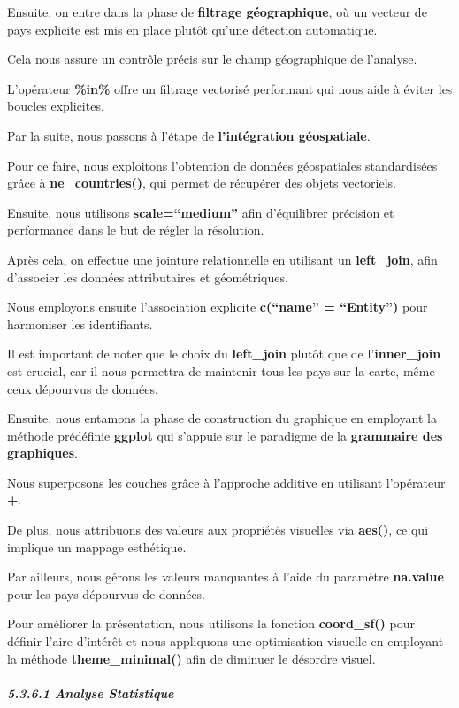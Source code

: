 \documentclass[
]{article}
\begin{document}
Ensuite, on entre dans la phase de \textbf{filtrage géographique}, où un
vecteur de pays explicite est mis en place plutôt qu'une détection
automatique.

Cela nous assure un contrôle précis sur le champ géographique de
l'analyse.

L'opérateur \textbf{\%in\%} offre un filtrage vectorisé performant qui
nous aide à éviter les boucles explicites.

Par la suite, nous passons à l'étape de \textbf{l'intégration
géospatiale}.

Pour ce faire, nous exploitons l'obtention de données géospatiales
standardisées grâce à \textbf{ne\_countries()}, qui permet de récupérer
des objets vectoriels.

Ensuite, nous utilisons \textbf{scale=``medium''} afin d'équilibrer
précision et performance dans le but de régler la résolution.

Après cela, on effectue une jointure relationnelle en utilisant un
\textbf{left\_join}, afin d'associer les données attributaires et
géométriques.

Nous employons ensuite l'association explicite \textbf{c(``name'' =
``Entity'')} pour harmoniser les identifiants.

Il est important de noter que le choix du \textbf{left\_join} plutôt que
de l'\textbf{inner\_join} est crucial, car il nous permettra de
maintenir tous les pays sur la carte, même ceux dépourvus de données.

Ensuite, nous entamons la phase de construction du graphique en
employant la méthode prédéfinie \textbf{ggplot} qui s'appuie sur le
paradigme de la \textbf{grammaire des graphiques}.

Nous superposons les couches grâce à l'approche additive en utilisant
l'opérateur \textbf{+}.

De plus, nous attribuons des valeurs aux propriétés visuelles via
\textbf{aes()}, ce qui implique un mappage esthétique.

Par ailleurs, nous gérons les valeurs manquantes à l'aide du paramètre
\textbf{na.value} pour les pays dépourvus de données.

Pour améliorer la présentation, nous utilisons la fonction
\textbf{coord\_sf()} pour définir l'aire d'intérêt et nous appliquons
une optimisation visuelle en employant la méthode
\textbf{theme\_minimal()} afin de diminuer le désordre visuel.

\subparagraph{5.3.6.1 Analyse Statistique}\label{analyse-statistique}
\end{document}
